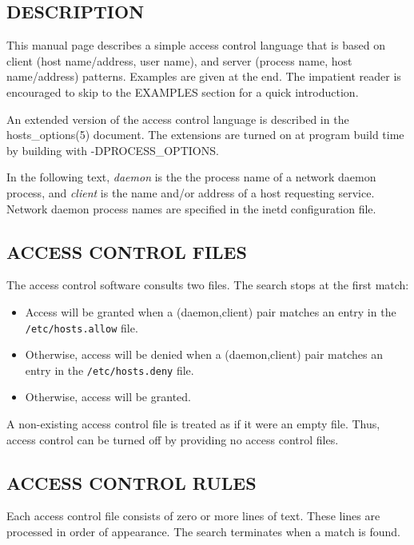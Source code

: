 \documentclass[11pt,twoside,onecolumn]{book}
\begin{document}
\subsection*{DESCRIPTION}

This manual page describes a simple access control language that is
based on client (host name/address, user name), and server (process
name, host name/address) patterns.  Examples are given at the end. The
impatient reader is encouraged to skip to the EXAMPLES section for a
quick introduction.

An extended version of the access control language is described in the
hosts\_options(5) document. The extensions are turned on at
program build time by building with -DPROCESS\_OPTIONS.

In the following text, {\em daemon} is the the process name of a
network daemon process, and {\em client} is the name and/or address of
a host requesting service. Network daemon process names are specified
in the inetd configuration file.

\subsection*{ACCESS CONTROL FILES}

The access control software consults two files. The search stops
at the first match:

\begin{itemize}
\item Access will be granted when a (daemon,client) pair matches an entry in
the {\tt /etc/hosts.allow} file.

\item Otherwise, access will be denied when a (daemon,client) pair matches an
entry in the {\tt /etc/hosts.deny} file.

\item Otherwise, access will be granted.

\end{itemize}

A non-existing access control file is treated as if it were an empty
file. Thus, access control can be turned off by providing no access
control files.

\subsection*{ACCESS CONTROL RULES}

Each access control file consists of zero or more lines of text.  These
lines are processed in order of appearance. The search terminates when a
match is found.
\end{document}
